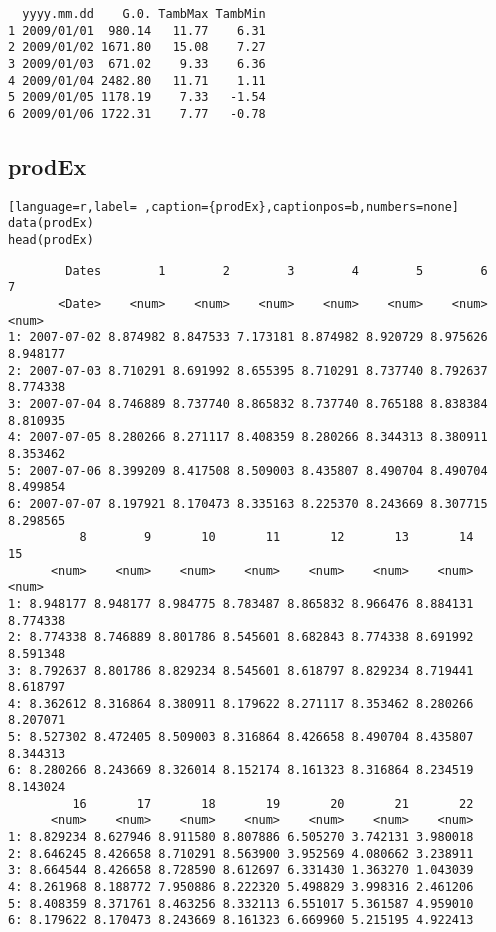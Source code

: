 \begin{verbatim}
  yyyy.mm.dd    G.0. TambMax TambMin
1 2009/01/01  980.14   11.77    6.31
2 2009/01/02 1671.80   15.08    7.27
3 2009/01/03  671.02    9.33    6.36
4 2009/01/04 2482.80   11.71    1.11
5 2009/01/05 1178.19    7.33   -1.54
6 2009/01/06 1722.31    7.77   -0.78
\end{verbatim}

\subsection{prodEx}
\label{sec:org0495863}
\label{subsec:prodex}
\begin{lstlisting}[language=r,label= ,caption={prodEx},captionpos=b,numbers=none]
data(prodEx)
head(prodEx)
\end{lstlisting}

\begin{verbatim}
        Dates        1        2        3        4        5        6        7
       <Date>    <num>    <num>    <num>    <num>    <num>    <num>    <num>
1: 2007-07-02 8.874982 8.847533 7.173181 8.874982 8.920729 8.975626 8.948177
2: 2007-07-03 8.710291 8.691992 8.655395 8.710291 8.737740 8.792637 8.774338
3: 2007-07-04 8.746889 8.737740 8.865832 8.737740 8.765188 8.838384 8.810935
4: 2007-07-05 8.280266 8.271117 8.408359 8.280266 8.344313 8.380911 8.353462
5: 2007-07-06 8.399209 8.417508 8.509003 8.435807 8.490704 8.490704 8.499854
6: 2007-07-07 8.197921 8.170473 8.335163 8.225370 8.243669 8.307715 8.298565
          8        9       10       11       12       13       14       15
      <num>    <num>    <num>    <num>    <num>    <num>    <num>    <num>
1: 8.948177 8.948177 8.984775 8.783487 8.865832 8.966476 8.884131 8.774338
2: 8.774338 8.746889 8.801786 8.545601 8.682843 8.774338 8.691992 8.591348
3: 8.792637 8.801786 8.829234 8.545601 8.618797 8.829234 8.719441 8.618797
4: 8.362612 8.316864 8.380911 8.179622 8.271117 8.353462 8.280266 8.207071
5: 8.527302 8.472405 8.509003 8.316864 8.426658 8.490704 8.435807 8.344313
6: 8.280266 8.243669 8.326014 8.152174 8.161323 8.316864 8.234519 8.143024
         16       17       18       19       20       21       22
      <num>    <num>    <num>    <num>    <num>    <num>    <num>
1: 8.829234 8.627946 8.911580 8.807886 6.505270 3.742131 3.980018
2: 8.646245 8.426658 8.710291 8.563900 3.952569 4.080662 3.238911
3: 8.664544 8.426658 8.728590 8.612697 6.331430 1.363270 1.043039
4: 8.261968 8.188772 7.950886 8.222320 5.498829 3.998316 2.461206
5: 8.408359 8.371761 8.463256 8.332113 6.551017 5.361587 4.959010
6: 8.179622 8.170473 8.243669 8.161323 6.669960 5.215195 4.922413
\end{verbatim}


